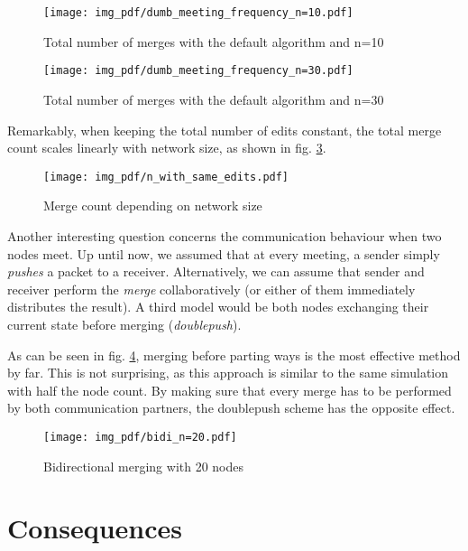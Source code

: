 \documentclass[conference,letterpaper]{IEEEtran}
\begin{document}
\begin{figure}
  \texttt{[image: img\_pdf/dumb\_meeting\_frequency\_n=10.pdf]}
  \caption{Total number of merges with the default algorithm and n=10}
  \label{fig:freq_dumb_n10}
\end{figure}
\begin{figure}
  \texttt{[image: img\_pdf/dumb\_meeting\_frequency\_n=30.pdf]}
  \caption{Total number of merges with the default algorithm and n=30}
  \label{fig:freq_dumb_n30}
\end{figure}

Remarkably, when keeping the total number of edits constant, the total merge count scales linearly with network size, as shown in fig. \ref{fig:n}.

\begin{figure}
  \texttt{[image: img\_pdf/n\_with\_same\_edits.pdf]}
  \caption{Merge count depending on network size}
  \label{fig:n}
\end{figure}



Another interesting question concerns the communication behaviour when two nodes meet. Up until now, we assumed that at every meeting, a sender simply \textit{pushes} a packet to a receiver. Alternatively, we can assume that sender and receiver perform the \textit{merge} collaboratively (or either of them immediately distributes the result). A third model would be both nodes exchanging their current state before merging (\textit{doublepush}).

As can be seen in fig. \ref{fig:bidi_n20}, merging before parting ways is the most effective method by far. This is not surprising, as this approach is similar to the same simulation with half the node count. By making sure that every merge has to be performed by both communication partners, the doublepush scheme has the opposite effect.

\begin{figure}
  \texttt{[image: img\_pdf/bidi\_n=20.pdf]}
  \caption{Bidirectional merging with 20 nodes}
  \label{fig:bidi_n20}
\end{figure}

\section{Consequences}
\end{document}
